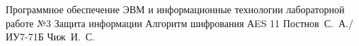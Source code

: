 \documentclass{bmstu}
\begin{document}
	
	{Программное обеспечение ЭВМ и информационные технологии}
	{лабораторной работе №3}
	{Защита информации}
	{Алгоритм шифрования АES}
	{11}
	{Постнов~С.~А./ИУ7-71Б}
	{Чиж~И.~С.}
	
	\maketableofcontents
	
	
	
	
	
	
	
	\makebibliography
	
\end{document}
